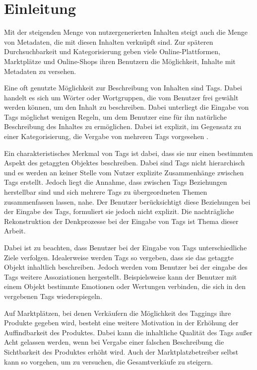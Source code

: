 \chapter{Einleitung}

Mit der steigenden Menge von nutzergenerierten Inhalten steigt auch die Menge von Metadaten, die mit diesen Inhalten verknüpft sind. Zur späteren Durchsuchbarkeit und Kategorisierung geben viele Online-Plattformen, Marktplätze und Online-Shops ihren Benutzern die Möglichkeit, Inhalte mit Metadaten zu versehen.

Eine oft genutzte Möglichkeit zur Beschreibung von Inhalten sind Tags. Dabei handelt es sich um Wörter oder Wortgruppen, die vom Benutzer frei gewählt werden können, um den Inhalt zu beschreiben. Dabei unterliegt die Eingabe von Tags möglichst wenigen Regeln, um dem Benutzer eine für ihn natürliche Beschreibung des Inhaltes zu ermöglichen. Dabei ist explizit, im Gegensatz zu einer Kategorisierung, die Vergabe von mehreren Tags vorgesehen \cite{sc2005}.

Ein charakteristisches Merkmal von Tags ist dabei, dass sie nur einen bestimmten Aspekt des getaggten Objektes beschreiben. Dabei sind Tags nicht hierarchisch und es werden an keiner Stelle vom Nutzer explizite Zusammenhänge zwischen Tags erstellt. Jedoch liegt die Annahme, dass zwischen Tags Beziehungen herstellbar sind und sich mehrere Tags zu übergeordneten Themen zusammenfassen lassen, nahe. Der Benutzer berücksichtigt diese Beziehungen bei der Eingabe des Tags, formuliert sie jedoch nicht explizit. Die nachträgliche Rekonstruktion der Denkprozesse bei der Eingabe von Tags ist Thema dieser Arbeit.

Dabei ist zu beachten, dass Benutzer bei der Eingabe von Tags unterschiedliche Ziele verfolgen. Idealerweise werden Tags so vergeben, dass sie das getaggte Objekt inhaltlich beschreiben. Jedoch werden vom Benutzer bei der eingabe des Tags weitere Assoziationen hergestellt. Beispielsweise kann der Benutzer mit einem Objekt bestimmte Emotionen oder Wertungen verbinden, die sich in den vergebenen Tags wiederspiegeln.

Auf Marktplätzen, bei denen Verkäufern die Möglichkeit des Taggings ihre Produkte gegeben wird, besteht eine weitere Motivation in der Erhöhung der Auffindbarkeit des Produktes. Dabei kann die inhaltliche Qualität des Tags außer Acht gelassen werden, wenn bei Vergabe einer falschen Beschreibung die Sichtbarkeit des Produktes erhöht wird. Auch der Marktplatzbetreiber selbst kann so vorgehen, um zu versuchen, die Gesamtverkäufe zu steigern.

